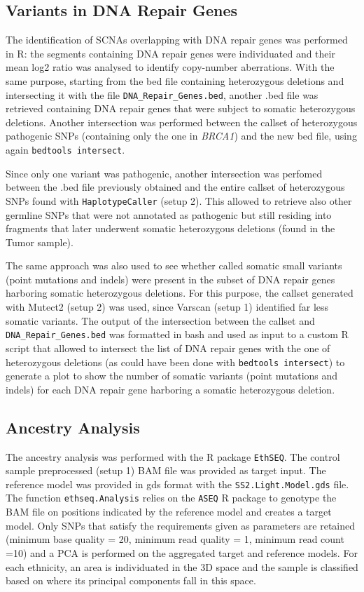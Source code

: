 \documentclass[11pt]{article}
\begin{document}
\subsection*{Variants in DNA Repair Genes}

The identification of SCNAs overlapping with DNA repair genes was performed in R: the segments containing DNA repair genes were individuated and their mean log2 ratio was analysed to identify copy-number aberrations. With the same purpose, starting from the bed file containing heterozygous deletions and intersecting it with the file \texttt{DNA\_Repair\_Genes.bed}, another .bed file was retrieved containing DNA repair genes that were subject to somatic heterozygous deletions. Another intersection was performed between the callset of heterozygous pathogenic SNPs (containing only the one in \emph{BRCA1}) and the new bed file, using again \texttt{bedtools intersect}. 

Since only one variant was pathogenic, another intersection was perfomed between the .bed file previously obtained and the entire callset of heterozygous SNPs found with \texttt{HaplotypeCaller} (setup 2). This allowed to retrieve also other germline SNPs that were not annotated as pathogenic but still residing into fragments that later underwent somatic heterozygous deletions (found in the Tumor sample). 

The same approach was also used to see whether called somatic small variants (point mutations and indels) were present in the subset of DNA repair genes harboring somatic heterozygous deletions. For this purpose, the callset generated with Mutect2 (setup 2) was used, since Varscan (setup 1) identified far less somatic variants.
The output of the intersection between the callset and \texttt{DNA\_Repair\_Genes.bed} was formatted in bash and used as input to a custom R script that allowed to intersect the list of DNA repair genes with the one of heterozygous deletions (as could have been done with \texttt{bedtools intersect}) to generate a plot to show the number of somatic variants (point mutations and indels) for each DNA repair gene harboring a somatic heterozygous deletion.



\subsection*{Ancestry Analysis}

The ancestry analysis was performed with the R package \texttt{EthSEQ}\cite{ethseq}. The control sample preprocessed (setup 1) BAM file was provided as target input. The reference model was provided in gds format with the \texttt{SS2.Light.Model.gds} file. The function \texttt{ethseq.Analysis} relies on the \texttt{ASEQ} R package to genotype the BAM file on positions indicated by the reference model and creates a target model. Only SNPs that satisfy the requirements given as parameters are retained (minimum base quality = 20, minimum read quality = 1, minimum read count =10) and a PCA is performed on the aggregated target and reference models. For each ethnicity, an area is individuated in the 3D space and the sample is classified based on where its principal components fall in this space.
\end{document}
